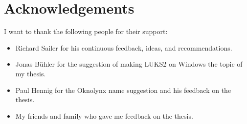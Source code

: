 \chapter{Acknowledgements}
\label{app:acknowledgements}
I want to thank the following people for their support:
\begin{itemize}
	\item Richard Sailer for his continuous feedback, ideas, and recommendations.
	\item Jonas Bühler for the suggestion of making LUKS2 on Windows the topic of my thesis.
	\item Paul Hennig for the Oknolynx name suggestion and his feedback on the thesis.
	\item My friends and family who gave me feedback on the thesis.
\end{itemize}
